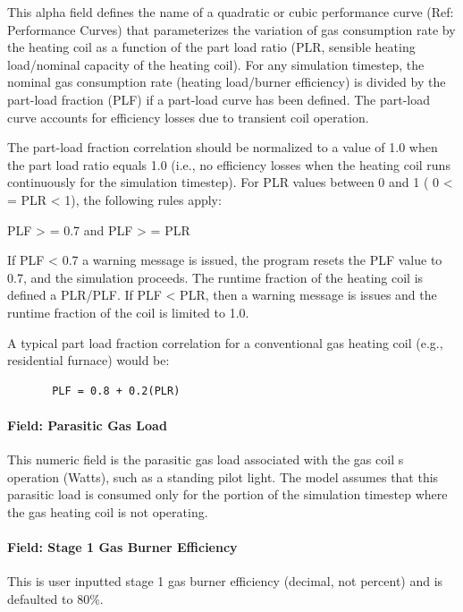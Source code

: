 This alpha field defines the name of a quadratic or cubic performance curve (Ref: Performance Curves) that parameterizes the variation of gas consumption rate by the heating coil as a function of the part load ratio (PLR, sensible heating load/nominal capacity of the heating coil). For any simulation timestep, the nominal gas consumption rate (heating load/burner efficiency) is divided by the part-load fraction (PLF) if a part-load curve has been defined. The part-load curve accounts for efficiency losses due to transient coil operation.

The part-load fraction correlation should be normalized to a value of 1.0 when the part load ratio equals 1.0 (i.e., no efficiency losses when the heating coil runs continuously for the simulation timestep). For PLR values between 0 and 1 ( 0 \textless{} = PLR \textless{} 1), the following rules apply:

PLF \textgreater{} = 0.7 and PLF \textgreater{} = PLR

If PLF \textless{} 0.7 a warning message is issued, the program resets the PLF value to 0.7, and the simulation proceeds. The runtime fraction of the heating coil is defined a PLR/PLF. If PLF \textless{} PLR, then a warning message is issues and the runtime fraction of the coil is limited to 1.0.

A typical part load fraction correlation for a conventional gas heating coil (e.g., residential furnace) would be:

\begin{lstlisting}
       PLF = 0.8 + 0.2(PLR)
\end{lstlisting}

\paragraph{Field: Parasitic Gas Load}\label{field-parasitic-gas-load-1}

This numeric field is the parasitic gas load associated with the gas coil s operation (Watts), such as a standing pilot light. The model assumes that this parasitic load is consumed only for the portion of the simulation timestep where the gas heating coil is not operating.

\paragraph{Field: Stage 1 Gas Burner Efficiency}\label{field-stage-1-gas-burner-efficiency}

This is user inputted stage 1 gas burner efficiency (decimal, not percent) and is defaulted to 80\%.

